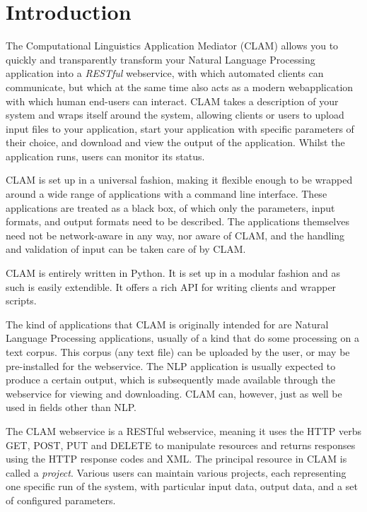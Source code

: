 \documentclass[a4paper,12pt]{report}
\begin{document}
\chapter{Introduction} 

The Computational Linguistics Application Mediator (CLAM) allows you to quickly
and transparently transform your Natural Language Processing application into a
\emph{RESTful}\/ webservice, with which automated clients can communicate, but
which at the same time also acts as a modern webapplication with which human
end-users can interact. CLAM takes a description of your system and wraps
itself around the system, allowing clients or users to upload input files to
your application, start your application with specific parameters of their
choice, and download and view the output of the application. Whilst the
application runs, users can monitor its status.

CLAM is set up in a universal fashion, making it flexible enough to be wrapped
around a wide range of applications with a command line interface. These
applications are treated as a black box, of which only the parameters, input
formats, and output formats need to be described. The applications themselves
need not be network-aware in any way, nor aware of CLAM, and the handling and
validation of input can be taken care of by CLAM.

CLAM is entirely written in Python. It is set up in a modular fashion and as
such is easily extendible. It offers a rich API for writing clients and wrapper
scripts.

The kind of applications that CLAM is originally intended for are Natural Language
Processing applications, usually of a kind that do some processing on a text
corpus. This corpus (any text file) can be uploaded by the user, or may be
pre-installed for the webservice. The NLP application is usually expected to
produce a certain output, which is subsequently made available through the
webservice for viewing and downloading. CLAM can, however, just as well be used
in fields other than NLP.

The CLAM webservice is a RESTful webservice\cite{REST}, meaning it uses the HTTP verbs
GET, POST, PUT and DELETE to manipulate resources and returns responses using
the HTTP response codes and XML. The principal resource in CLAM is called a
\emph{project}. Various users can maintain various projects, each representing
one specific run of the system, with particular input data, output data, and a
set of configured parameters.
\end{document}
